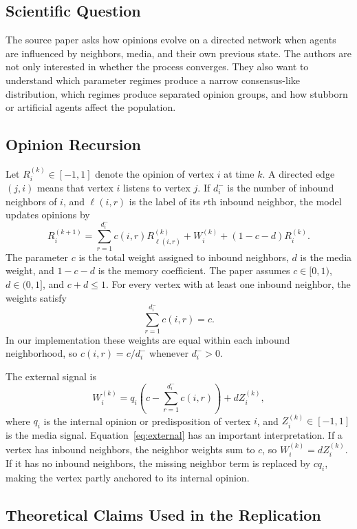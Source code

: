 \documentclass[11pt]{article}
\begin{document}
\subsection{Scientific Question}

The source paper asks how opinions evolve on a directed network when agents are
influenced by neighbors, media, and their own previous state.  The authors are
not only interested in whether the process converges.  They also want to
understand which parameter regimes produce a narrow consensus-like distribution,
which regimes produce separated opinion groups, and how stubborn or artificial
agents affect the population.

\subsection{Opinion Recursion}

Let $R_i^{(k)} \in [-1,1]$ denote the opinion of vertex $i$ at time $k$.  A
directed edge $(j,i)$ means that vertex $i$ listens to vertex $j$.  If $d_i^-$
is the number of inbound neighbors of $i$, and $\ell(i,r)$ is the label of its
$r$th inbound neighbor, the model updates opinions by
\begin{equation}
R_i^{(k+1)}
= \sum_{r=1}^{d_i^-} c(i,r)R_{\ell(i,r)}^{(k)}
  + W_i^{(k)}
  + (1-c-d)R_i^{(k)} .
\label{eq:update}
\end{equation}
The parameter $c$ is the total weight assigned to inbound neighbors, $d$ is the
media weight, and $1-c-d$ is the memory coefficient.  The paper assumes
$c\in[0,1)$, $d\in(0,1]$, and $c+d\leq1$.  For every vertex with at least one
inbound neighbor, the weights satisfy
\[
\sum_{r=1}^{d_i^-} c(i,r)=c.
\]
In our implementation these weights are equal within each inbound neighborhood,
so $c(i,r)=c/d_i^-$ whenever $d_i^->0$.

The external signal is
\begin{equation}
W_i^{(k)}
= q_i\left(c-\sum_{r=1}^{d_i^-}c(i,r)\right)+dZ_i^{(k)} ,
\label{eq:external}
\end{equation}
where $q_i$ is the internal opinion or predisposition of vertex $i$, and
$Z_i^{(k)}\in[-1,1]$ is the media signal.  Equation~\eqref{eq:external} has an
important interpretation.  If a vertex has inbound neighbors, the neighbor
weights sum to $c$, so $W_i^{(k)}=dZ_i^{(k)}$.  If it has no inbound neighbors,
the missing neighbor term is replaced by $cq_i$, making the vertex partly
anchored to its internal opinion.

\subsection{Theoretical Claims Used in the Replication}
\end{document}
